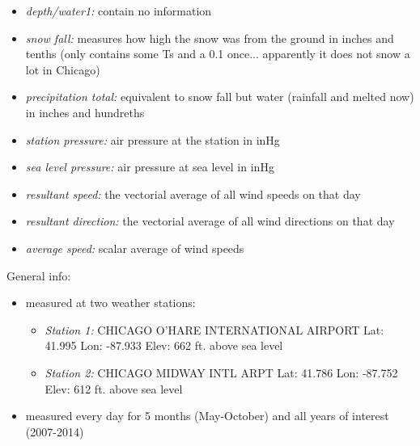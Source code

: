 \documentclass[a4, 12pt]{article}
\begin{document}
\begin{itemize}
\item \emph{depth/water1:} contain no information
\item \emph{snow fall:} measures how high the snow was from the ground in inches and tenths (only contains some Ts and a 0.1 once... apparently it does not snow a lot in Chicago)
\item \emph{precipitation total:} equivalent to snow fall but water (rainfall and melted now) in inches and hundreths
\item \emph{station pressure:} air pressure at the station in inHg
\item \emph{sea level pressure:} air pressure at sea level in inHg
\item \emph{resultant speed:} the vectorial average of all wind speeds on that day
\item \emph{resultant direction:} the vectorial average of all wind directions on that day
\item \emph{average speed:} scalar average of wind speeds
\end{itemize}

General info:
\begin{itemize}
\item measured at two weather stations: 
\begin{itemize}
\item \emph{Station 1:} CHICAGO O'HARE INTERNATIONAL AIRPORT Lat: 41.995 Lon: -87.933 Elev: 662 ft. above sea level
\item \emph{Station 2:} CHICAGO MIDWAY INTL ARPT Lat: 41.786 Lon: -87.752 Elev: 612 ft. above sea level
\end{itemize}
\item measured every day for 5 months (May-October) and all years of interest (2007-2014)
\end{itemize}
\end{document}
